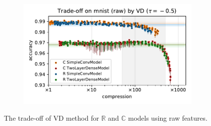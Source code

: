 \documentclass[a4paper,10pt,onecolumn]{article}
\newcommand{\real}{\mathbb{R}}
\newcommand{\cplx}{\mathbb{C}}
\begin{document}
\begin{figure}[b]
\begin{subfigure}[b]{0.5\columnwidth}
  \end{subfigure}%
  \begin{subfigure}[b]{0.5\columnwidth}
    \centering
    \includegraphics[width=\linewidth]{figure__mnist-like__trade-off/appendix__VD__mnist__raw__-0.5.pdf}
  \end{subfigure}
  \caption{%
    The trade-off of VD method for $\real$ and $\cplx$ models using raw features.
  }
  \label{fig:appendix__mnist-like__trade-off__VD__raw}
\end{figure}
\end{document}
